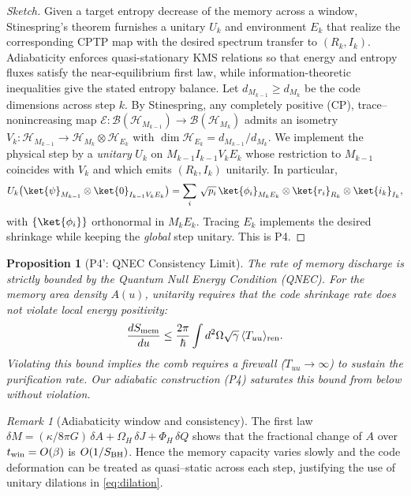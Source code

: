 \documentclass[aps,prd,preprint,onecolumn,superscriptaddress,nofootinbib,longbibliography,floatfix,11pt,showpacs,showkeys]{revtex4-2}
\theoremstyle{plain}
\newtheorem{proposition}[theorem]{Proposition}
\theoremstyle{definition}
\theoremstyle{remark}
\newtheorem{remark}[theorem]{Remark}
\begin{document}
\begin{proof}[Sketch]
Given a target entropy decrease of the memory across a window, Stinespring's theorem furnishes a unitary $U_k$ and environment $E_k$
that realize the corresponding CPTP map with the desired spectrum transfer to $(R_k,I_k)$. Adiabaticity enforces quasi-stationary KMS
relations so that energy and entropy fluxes satisfy the near-equilibrium first law, while information-theoretic inequalities give the
stated entropy balance.
Let $d_{M_{k-1}}\ge d_{M_k}$ be the code dimensions across step $k$. By Stinespring, any completely positive (CP), trace--nonincreasing map $\mathcal{E}:\mathcal{B}(\mathcal{H}_{M_{k-1}})\to\mathcal{B}(\mathcal{H}_{M_k})$ admits an isometry $V_k:\mathcal{H}_{M_{k-1}}\to\mathcal{H}_{M_k}\otimes\mathcal{H}_{E_k}$ with $\dim\mathcal{H}_{E_k}=d_{M_{k-1}}/d_{M_k}$. We implement the physical step by a \emph{unitary} $U_k$ on $M_{k-1}I_{k-1}V_kE_k$ whose restriction to $M_{k-1}$ coincides with $V_k$ and which emits $(R_k,I_k)$ unitarily. In particular,
\begin{equation}
\label{eq:dilation}
U_k\big(\ket{\psi}_{M_{k-1}}\otimes\ket{0}_{I_{k-1}V_kE_k}\big)
=\sum_{i}\,\sqrt{p_i}\,\ket{\phi_i}_{M_k E_k}\otimes\ket{r_i}_{R_k}\otimes\ket{i_k}_{I_k},
\end{equation}
with $\{\ket{\phi_i}\}$ orthonormal in $M_kE_k$. Tracing $E_k$ implements the desired shrinkage while keeping the \emph{global} step unitary. This is P4.
\end{proof}

\begin{proposition}[P4': QNEC Consistency Limit]\label{prop:qnec-consistency}
The rate of memory discharge is strictly bounded by the Quantum Null Energy Condition (QNEC). For the memory area density $A(u)$, unitarity requires that the code shrinkage rate does not violate local energy positivity:
\begin{equation}
\frac{d S_{\rm mem}}{du} \le \frac{2\pi}{\hbar} \int d^2\Omega \sqrt{\gamma} \, \langle T_{uu} \rangle_{\rm ren}.
\end{equation}
Violating this bound implies the comb requires a firewall ($T_{uu} \to \infty$) to sustain the purification rate. Our adiabatic construction (P4) saturates this bound from below without violation.
\end{proposition}

\begin{remark}[Adiabaticity window and consistency]\label{rem:adiabaticity_window}
The first law $\delta M=(\kappa/8\pi G)\,\delta A + \Omega_H\,\delta J+\Phi_H\,\delta Q$ shows that the fractional change of $A$ over $t_{\rm win}=O(\beta)$ is $O(1/S_{\rm BH})$. Hence the memory capacity varies slowly and the code deformation can be treated as quasi--static across each step, justifying the use of unitary dilations in \eqref{eq:dilation}.
\end{remark}
\end{document}
